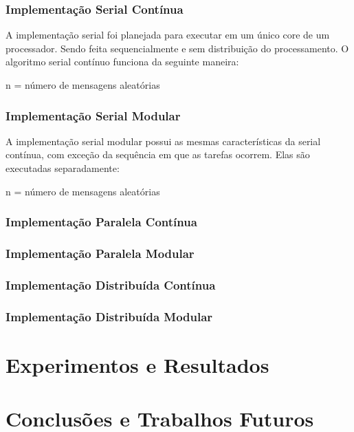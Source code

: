\documentclass[12pt]{article}
\begin{document}
\subsubsection{Implementação Serial Contínua}

A implementação serial foi planejada para executar em um único core de um processador. Sendo feita sequencialmente
e sem distribuição do processamento. O algoritmo serial contínuo funciona da seguinte maneira:
\begin{algorithm}[H]
  n = número de mensagens aleatórias\;
\end{algorithm}

\subsubsection{Implementação Serial Modular}

A implementação serial modular possui as mesmas características da serial contínua, com exceção da sequência em que as
tarefas ocorrem. Elas são executadas separadamente:
\begin{algorithm}[H]
  n = número de mensagens aleatórias\;
\end{algorithm}

\subsubsection{Implementação Paralela Contínua}

\subsubsection{Implementação Paralela Modular}

\subsubsection{Implementação Distribuída Contínua}

\subsubsection{Implementação Distribuída Modular}

\section{Experimentos e Resultados}

\section{Conclusões e Trabalhos Futuros}



\end{document}
